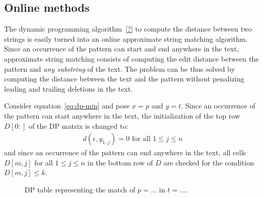 
\subsection{Online methods}
\label{sub:introonline}





The dynamic programming algorithm~\ref{?} to compute the distance between two strings is easily turned into an online approximate string matching algorithm.
Since an occurrence of the pattern can start and end anywhere in the text, approximate string matching consists of computing the edit distance between the pattern and \emph{any substring} of the text.
The problem can be thus solved by computing the distance between the text and the pattern without penalizing leading and trailing deletions in the text.

Consider equation~\ref{eq:dp-min} and pose $x=p$ and $y=t$.
Since an occurrence of the pattern can start anywhere in the text, the initialization of the top row $D[0:]$ of the DP matrix is changed to:
\begin{eqnarray}
d(\epsilon, y_{1..j}) = 0 \text{ for all } 1 \leq j \leq n
\end{eqnarray}
and since an occurrence of the pattern can end anywhere in the text, all cells $D[m,j]$ for all $1 \leq j \leq n$ in the bottom row of $D$ are checked for the condition $D[m,j] \leq k$.

\begin{figure}[h]
\begin{center}
\caption[Example of approximate string matching via DP]{DP table representing the match of $p=...$ in $t=...$.}
\label{fig:asm-dp}

\end{center}
\end{figure}


